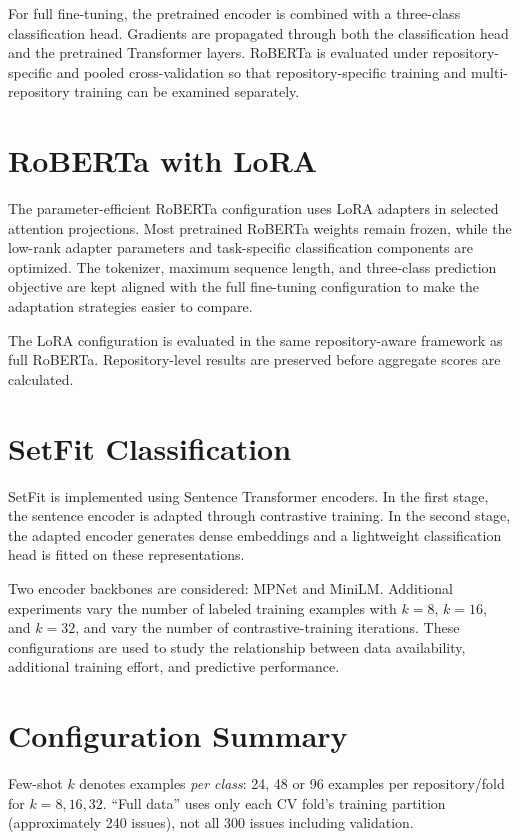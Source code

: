 For full fine-tuning, the pretrained encoder is combined with a three-class classification head. Gradients are propagated through both the classification head and the pretrained Transformer layers. RoBERTa is evaluated under repository-specific and pooled cross-validation so that repository-specific training and multi-repository training can be examined separately.

\section{RoBERTa with LoRA}
The parameter-efficient RoBERTa configuration uses LoRA adapters in selected attention projections. Most pretrained RoBERTa weights remain frozen, while the low-rank adapter parameters and task-specific classification components are optimized. The tokenizer, maximum sequence length, and three-class prediction objective are kept aligned with the full fine-tuning configuration to make the adaptation strategies easier to compare.

The LoRA configuration is evaluated in the same repository-aware framework as full RoBERTa. Repository-level results are preserved before aggregate scores are calculated.

\section{SetFit Classification}
SetFit is implemented using Sentence Transformer encoders. In the first stage, the sentence encoder is adapted through contrastive training. In the second stage, the adapted encoder generates dense embeddings and a lightweight classification head is fitted on these representations.

Two encoder backbones are considered: MPNet and MiniLM. Additional experiments vary the number of labeled training examples with $k=8$, $k=16$, and $k=32$, and vary the number of contrastive-training iterations. These configurations are used to study the relationship between data availability, additional training effort, and predictive performance.

\section{Configuration Summary}
Few-shot $k$ denotes examples \emph{per class}: 24, 48 or 96 examples per repository/fold for $k=8,16,32$. ``Full data'' uses only each CV fold's training partition (approximately 240 issues), not all 300 issues including validation.

